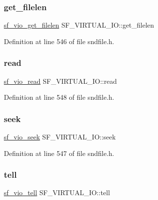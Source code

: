 \subsubsection{\texorpdfstring{get\_filelen}{get\_filelen}}
{\footnotesize\ttfamily \mbox{\hyperlink{sndfile_8h_a2166198457fe4e852ef10804b2c1e8a1}{sf\+\_\+vio\+\_\+get\+\_\+filelen}} S\+F\+\_\+\+V\+I\+R\+T\+U\+A\+L\+\_\+\+I\+O\+::get\+\_\+filelen}



Definition at line 546 of file sndfile.\+h.

\mbox{\label{struct_s_f___v_i_r_t_u_a_l___i_o_af5fbdef0ac173a604b2dff50f210982a}} 
\subsubsection{\texorpdfstring{read}{read}}
{\footnotesize\ttfamily \mbox{\hyperlink{sndfile_8h_a90c34518e3de9fbed3611b030e17dba7}{sf\+\_\+vio\+\_\+read}} S\+F\+\_\+\+V\+I\+R\+T\+U\+A\+L\+\_\+\+I\+O\+::read}



Definition at line 548 of file sndfile.\+h.

\mbox{\label{struct_s_f___v_i_r_t_u_a_l___i_o_aa8ac1ef2302a43acca58a02e809a815f}} 
\subsubsection{\texorpdfstring{seek}{seek}}
{\footnotesize\ttfamily \mbox{\hyperlink{sndfile_8h_ad23e218718c16eae24b98d41976ac5d2}{sf\+\_\+vio\+\_\+seek}} S\+F\+\_\+\+V\+I\+R\+T\+U\+A\+L\+\_\+\+I\+O\+::seek}



Definition at line 547 of file sndfile.\+h.

\mbox{\label{struct_s_f___v_i_r_t_u_a_l___i_o_ac40bf7a24e909f0ebec62fab7c0321b2}} 
\subsubsection{\texorpdfstring{tell}{tell}}
{\footnotesize\ttfamily \mbox{\hyperlink{sndfile_8h_a457595d4cdaf505525ff421aebe6eb5d}{sf\+\_\+vio\+\_\+tell}} S\+F\+\_\+\+V\+I\+R\+T\+U\+A\+L\+\_\+\+I\+O\+::tell}



